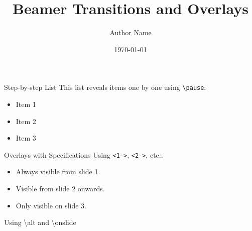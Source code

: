 \documentclass[aspectratio=169]{beamer}
\title{Beamer Transitions and Overlays}
\author{Author Name}
\date{\today}
\begin{document}
\begin{frame}
    \titlepage
\end{frame}

\begin{frame}{Step-by-step List}
    This list reveals items one by one using \texttt{\textbackslash pause}:
    \begin{itemize}
        \item Item 1 \pause
        \item Item 2 \pause
        \item Item 3
    \end{itemize}
\end{frame}

\begin{frame}{Overlays with Specifications}
    Using \texttt{<1->}, \texttt{<2->}, etc.:
    \begin{itemize}
        \item<1-> Always visible from slide 1.
        \item<2-> Visible from slide 2 onwards.
        \item<3> Only visible on slide 3.
    \end{itemize}
\end{frame}

\begin{frame}{Using \textbackslash alt and \textbackslash onslide}
    

\end{frame}
\end{document}
